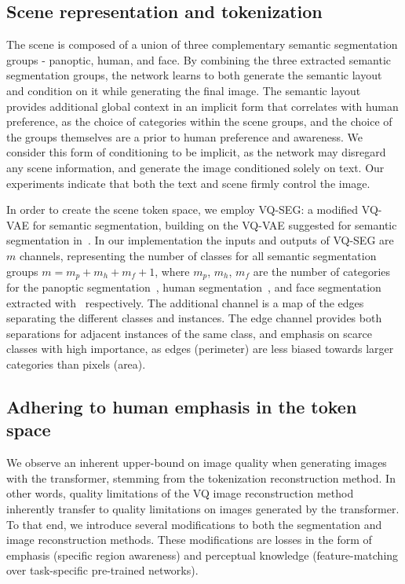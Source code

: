 \documentclass[final]{cvpr}
\begin{document}
\subsection{Scene representation and tokenization}
The scene is composed of a union of three complementary semantic segmentation groups - panoptic, human, and face.
By combining the three extracted semantic segmentation groups, the network learns to both generate the semantic layout and condition on it while generating the final image. The semantic layout provides additional global context in an implicit form that correlates with human preference, as the choice of categories within the scene groups, and the choice of the groups themselves are a prior to human preference and awareness. We consider this form of conditioning to be implicit, as the network may disregard any scene information, and generate the image conditioned solely on text. Our experiments indicate that both the text and scene firmly control the image.

In order to create the scene token space, we employ VQ-SEG: a modified VQ-VAE for semantic segmentation, building on the VQ-VAE suggested for semantic segmentation in~\cite{esser2021taming}. 
In our implementation the inputs and outputs of VQ-SEG are $m$ channels, representing the number of classes for all semantic segmentation groups $m=m_p+m_h+m_f+1$, where $m_p$, $m_h$, $m_f$ are the number of categories for the panoptic segmentation~\cite{wu2019detectron2}, human segmentation~\cite{li2020self}, and face segmentation extracted with~\cite{bulat2017far} respectively. The additional channel is a map of the edges separating the different classes and instances. The edge channel provides both separations for adjacent instances of the same class, and emphasis on scarce classes with high importance, as edges (perimeter) are less biased towards larger categories than pixels (area).

\subsection{Adhering to human emphasis in the token space}
We observe an inherent upper-bound on image quality when generating images with the transformer, stemming from the tokenization reconstruction method. In other words, quality limitations of the VQ image reconstruction method inherently transfer to quality limitations on images generated by the transformer. To that end, we introduce several modifications to both the segmentation and image reconstruction methods. These modifications are losses in the form of emphasis (specific region awareness) and perceptual knowledge (feature-matching over task-specific pre-trained networks). 
\end{document}
